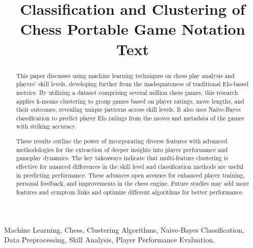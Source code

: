 \documentclass[conference]{IEEEtran}
\begin{document}
\title{Classification and Clustering of Chess Portable Game Notation Text\\
}

\author{
\and
{}
}

\maketitle

\begin{abstract}
This paper discusses using machine learning techniques on chess play analysis and players' skill levels, developing further from the inadequateness of traditional Elo-based metrics. By utilizing a dataset comprising several million chess games, this research applies k-means clustering to group games based on player ratings, move lengths, and their outcomes, revealing unique patterns across skill levels. It also uses Naive-Bayes classification to predict player Elo ratings from the moves and metadata of the games with striking accuracy.

These results outline the power of incorporating diverse features with advanced methodologies for the extraction of deeper insights into player performance and gameplay dynamics. The key takeaways indicate that multi-feature clustering is effective for nuanced differences in the skill level and classification methods are useful in predicting performance. These advances open avenues for enhanced player training, personal feedback, and improvements in the chess engine. Future studies may add more features and symptom links and optimize different algorithms for better performance.
\end{abstract}

\begin{IEEEkeywords}
Machine Learning, Chess, Clustering Algorithms, Naive-Bayes Classification, Data Preprocessing, Skill Analysis, Player Performance Evaluation.
\end{IEEEkeywords}
\end{document}
